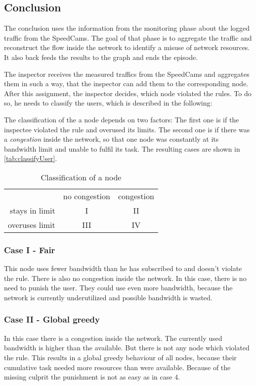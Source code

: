 \documentclass[thesis.tex]{subfiles}
\begin{document}
\subsection{Conclusion}
The conclusion uses the information from the monitoring phase about the logged traffic from the SpeedCams. The goal of that phase is to aggregate the traffic and reconstruct the flow inside the network to identify a misuse of network resources. It also back feeds the results to the graph and ends the episode.

The inspector receives the measured traffics from the SpeedCams and aggregates them in such a way, that the inspector can add them to the corresponding node. After this assignment, the inspector decides, which node violated the rules. To do so, he needs to classify the users, which is described in the following:

The classification of the a node depends on two factors: The first one is if the inspectee violated the rule and overused its limits. The second one is if there was a \textit{congestion} inside the network, so that one node was constantly at its bandwidth limit and unable to fulfil its task. The resulting cases are shown in \autoref{tab:classifyUser}.

\begin{table}[h]
    \centering
    \begin{tabular}{ r|c|c| }
        \multicolumn{1}{r}{}
        &  \multicolumn{1}{c}{no congestion}
        & \multicolumn{1}{c}{congestion} \\
        \cline{2-3}
        stays in limit & I & II \\
        \cline{2-3}
        overuses limit & III & IV \\
        \cline{2-3}
    \end{tabular}
    \caption{Classification of a node}
    \label{tab:classifyUser}    
\end{table}

\subsubsection{Case I - Fair} \label{sub:main:detection:case1}
This node uses fewer bandwidth than he has subscribed to and doesn't violate the rule. There is also no congestion inside the network. In this case, there is no need to punish the user. They could use even more bandwidth, because the network is currently underutilized and possible bandwidth is wasted.

\subsubsection{Case II - Global greedy}
In this case there is a congestion inside the network. The currently used bandwidth is higher than the available. But there is not any node which violated the rule. This results in a global greedy behaviour of all nodes, because their cumulative task needed more resources than were available.  Because of the missing culprit the punishment is not as easy as in case 4.
\end{document}
